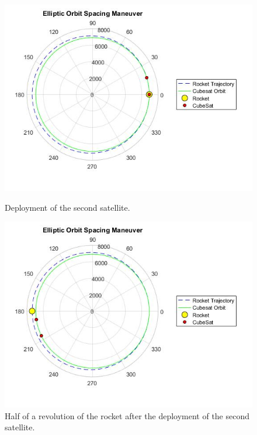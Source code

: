 \begin{figure}[H]
\includegraphics[scale=0.7]{./Sections_CD/S4-First_Placement/Images_S4/Picture_5_S4.jpg}
\caption{Deployment of the second satellite.}
\label{orbit3}
\includegraphics[scale=0.7]{./Sections_CD/S4-First_Placement/Images_S4/Picture_6_S4.jpg}
\caption{Half of a revolution of the rocket after the deployment of the second satellite.}
\label{orbit4}
\end{figure}
